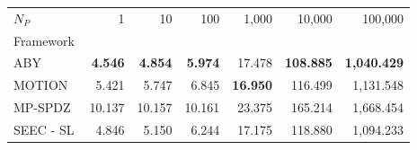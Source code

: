 \begin{tabular}{lrrrrrr}
\toprule
$N_P$ & 1 & 10 & 100 & 1,000 & 10,000 & 100,000 \\
Framework &  &  &  &  &  &  \\
\midrule
ABY~\cite{DSZ15} & \bfseries 4.546 & \bfseries 4.854 & \bfseries 5.974 & 17.478 & \bfseries 108.885 & \bfseries 1,040.429 \\
MOTION~\cite{BDST22} & 5.421 & 5.747 & 6.845 & \bfseries 16.950 & 116.499 & 1,131.548 \\
MP-SPDZ~\cite{CCS:Keller20} & 10.137 & 10.157 & 10.161 & 23.375 & 165.214 & 1,668.454 \\
SEEC - SL & 4.846 & 5.150 & 6.244 & 17.175 & 118.880 & 1,094.233 \\
\bottomrule
\end{tabular}
